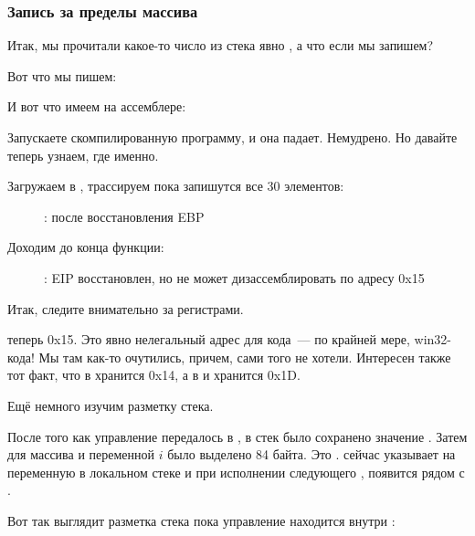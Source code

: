 \subsubsection{Запись за пределы массива}

Итак, мы прочитали какое-то число из стека явно , а что если мы запишем?

Вот что мы пишем:




И вот что имеем на ассемблере:



Запускаете скомпилированную программу, и она падает. Немудрено. Но давайте теперь узнаем, где именно.

\clearpage
\myindex{\olly}

Загружаем в \olly, трассируем пока запишутся все 30 элементов:

\begin{figure}[H]
\centering
{}
\caption{\olly: после восстановления EBP}
\label{fig:array_BO_olly_w1}
\end{figure}

\clearpage
Доходим до конца функции:

\begin{figure}[H]
\centering
{}
\caption{\olly: EIP восстановлен, но \olly не может дизассемблировать по адресу 0x15}
\label{fig:array_BO_olly_w2}
\end{figure}

Итак, следите внимательно за регистрами.

\EIP теперь 0x15. Это явно нелегальный адрес для кода~--- по крайней мере, win32-кода! 
Мы там как-то очутились, причем, сами того не хотели. Интересен также тот факт, что в \EBP хранится 0x14, 
а в \ECX и \EDX хранится 0x1D.

Ещё немного изучим разметку стека.

После того как управление передалось в \main, в стек было сохранено значение \EBP. 
Затем для массива и переменной $i$ было выделено 84 байта. Это . 
\ESP сейчас указывает на переменную  в локальном стеке и при исполнении следующего , 
 появится рядом с .

Вот так выглядит разметка стека пока управление находится внутри \main:

